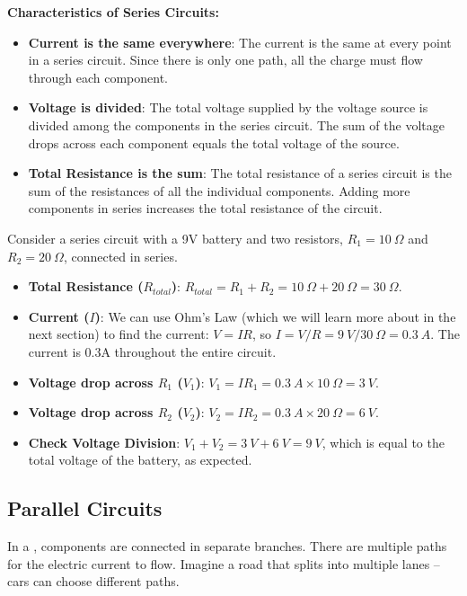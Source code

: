 \textbf{Characteristics of Series Circuits:}

\begin{itemize}
    \item \textbf{Current is the same everywhere}: The current is the same at every point in a series circuit.  Since there is only one path, all the charge must flow through each component.
    \item \textbf{Voltage is divided}: The total voltage supplied by the voltage source is divided among the components in the series circuit. The sum of the voltage drops across each component equals the total voltage of the source.
    \item \textbf{Total Resistance is the sum}: The total resistance of a series circuit is the sum of the resistances of all the individual components.  Adding more components in series increases the total resistance of the circuit.
\end{itemize}

\begin{example}
Consider a series circuit with a 9V battery and two resistors, $R_1 = 10\ \Omega$ and $R_2 = 20\ \Omega$, connected in series.

\begin{itemize}
    \item \textbf{Total Resistance ($R_{total}$)}: $R_{total} = R_1 + R_2 = 10\ \Omega + 20\ \Omega = 30\ \Omega$.
    \item \textbf{Current ($I$)}: We can use Ohm's Law (which we will learn more about in the next section) to find the current: $V = IR$, so $I = V/R = 9\ V / 30\ \Omega = 0.3\ A$. The current is 0.3A throughout the entire circuit.
    \item \textbf{Voltage drop across $R_1$ ($V_1$)}: $V_1 = IR_1 = 0.3\ A \times 10\ \Omega = 3\ V$.
    \item \textbf{Voltage drop across $R_2$ ($V_2$)}: $V_2 = IR_2 = 0.3\ A \times 20\ \Omega = 6\ V$.
    \item \textbf{Check Voltage Division}: $V_1 + V_2 = 3\ V + 6\ V = 9\ V$, which is equal to the total voltage of the battery, as expected.
\end{itemize}
\end{example}

\subsection{Parallel Circuits}

In a , components are connected in separate branches. There are multiple paths for the electric current to flow. Imagine a road that splits into multiple lanes – cars can choose different paths.

